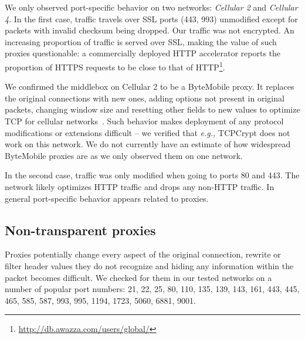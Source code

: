 \documentclass{sig-alternate-10pt}
\providecommand{\eg}{\emph{e.g.,} }
\begin{document}
We only observed port-specific behavior on two networks: \emph{Cellular 2} and \emph{Cellular 4}. In the first case, traffic travels over SSL ports (443, 993) unmodified except for packets with invalid checksum being dropped. Our traffic was not encrypted. An increasing proportion of traffic is served over SSL, making the value of such proxies questionable: a commercially deployed HTTP accelerator reports the proportion of HTTPS requests to be close to that of HTTP\footnote{\url{http://db.awazza.com/users/global/}}.

We confirmed the middlebox on Cellular 2 to be a ByteMobile proxy. It replaces the original connections with new ones, adding options not present in original packets, changing window size and resetting other fields to new values to optimize TCP for cellular networks~\cite{Ha:2006td}. Such behavior makes deployment of any protocol modifications or extensions difficult -- we verified that \eg TCPCrypt does not work on this network. We do not currently have an estimate of how widespread ByteMobile proxies are as we only observed them on one network.

In the second case, traffic was only modified when going to ports 80 and 443. The network likely optimizes HTTP traffic and drops any non-HTTP traffic. In general port-specific behavior appears related to proxies.

\subsection{Non-transparent proxies}
\label{sec:proxies}

Proxies potentially change every aspect of the original connection, rewrite or filter header values they do not recognize and hiding any information within the packet becomes difficult. We checked for them in our tested networks on a number of popular port numbers:
21, 22, 25, 80, 110, 135, 139, 143, 161, 443, 445, 465, 585, 587, 993, 995, 1194, 1723, 5060, 6881, 9001.
\end{document}
